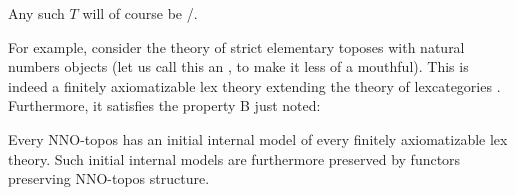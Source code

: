 Any such $T$ will of course be \initogeminal/.

For example, consider the theory of strict elementary toposes with natural numbers objects (let us call this an , to make it less of a mouthful). This is indeed a finitely axiomatizable lex theory extending the theory of lexcategories . Furthermore, it satisfies the property B just noted:

\begin{theorem}\label{NNOToposIsInitoGeminal}
Every NNO-topos has an initial internal model of every finitely axiomatizable lex theory. Such initial internal models are furthermore preserved by functors preserving NNO-topos structure.
\end{theorem}
